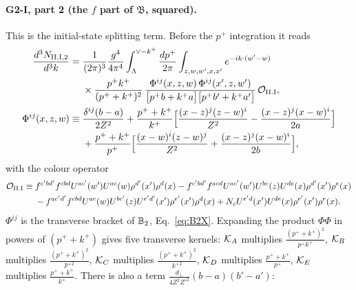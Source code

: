 \paragraph*{G2-I, part 2 (the $f$ part of $\mathfrak B$, squared).} This is the initial-state splitting term. Before the $p^+$ integration it reads
\begin{align}
\frac{d^3N_{\rm II.I,2}}{d^3k}={}&\frac{1}{(2\pi)^3}\frac{g^4}{4\pi^4}\int_{\Lambda}^{\vee-k^+}\frac{dp^+}{2\pi}\int_{z,w,w',x,x'}e^{-ik\cdot(w'-w)}\notag\\
&\times\frac{p^+k^+}{(p^++k^+)^2}\,\frac{\Phi^{ij}(x,z,w)\,\Phi^{ij}(x',z,w')}{\big[p^+b+k^+a\big]\big[p^+b'+k^+a'\big]}\,\mathcal{O}_{\rm II.I},
\label{eq:GIIIpart2}\\
\Phi^{ij}(x,z,w)\equiv{}&\frac{\delta^{ij}(b-a)}{2Z^2}+\frac{p^++k^+}{k^+}\Big[\frac{(x-z)^j(z-w)^i}{Z^2}-\frac{(x-z)^j(x-w)^i}{2a}\Big]\notag\\
&+\frac{p^++k^+}{p^+}\Big[\frac{(x-w)^i(z-w)^j}{Z^2}+\frac{(x-z)^j(x-w)^i}{2b}\Big],\notag
\end{align}
with the colour operator
\begin{align}
\mathcal{O}_{\rm II.I}\equiv{}&f^{c'bd'}f^{cbd}U^{ac'}(w')U^{ac}(w)\rho^{d'}(x')\rho^d(x)-f^{c'bd'}f^{acd}U^{ac'}(w')U^{bc}(z)U^{de}(x)\rho^{d'}(x')\rho^e(x)\notag\\
&-f^{ac'd'}f^{cbd}U^{ac}(w)U^{bc'}(z)U^{e'd'}(x')\rho^{e'}(x')\rho^d(x)+N_cU^{e'd}(x')U^{de}(x)\rho^{e'}(x')\rho^e(x).
\end{align}
$\Phi^{ij}$ is the transverse bracket of $\mathbb{B}_2$, Eq.~\eqref{eq:B2X}. Expanding the product $\Phi\Phi$ in powers of $(p^++k^+)$ gives five transverse kernels: $\mathcal{K}_A$ multiplies $\frac{(p^++k^+)^2}{p^+k^+}$, $\mathcal{K}_B$ multiplies $\frac{(p^++k^+)^2}{p^{+2}}$, $\mathcal{K}_C$ multiplies $\frac{(p^++k^+)^2}{k^{+2}}$, $\mathcal{K}_D$ multiplies $\frac{p^++k^+}{p^+}$, $\mathcal{K}_E$ multiplies $\frac{p^++k^+}{k^+}$. There is also a term $\frac{d_\perp}{4Z^2Z'^2}(b-a)(b'-a')$:
